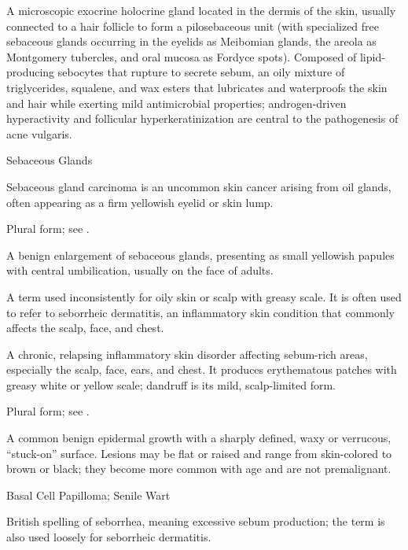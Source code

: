  A microscopic exocrine holocrine gland located in the dermis of the skin, usually connected to a hair follicle to form a pilosebaceous unit (with specialized free sebaceous glands occurring in the eyelids as Meibomian glands, the areola as Montgomery tubercles, and oral mucosa as Fordyce spots). Composed of lipid-producing sebocytes that rupture to secrete sebum, an oily mixture of triglycerides, squalene, and wax esters that lubricates and waterproofs the skin and hair while exerting mild antimicrobial properties; androgen-driven hyperactivity and follicular hyperkeratinization are central to the pathogenesis of acne vulgaris.

\synonyms
Sebaceous Glands

 Sebaceous gland carcinoma is an uncommon skin cancer arising from oil glands, often appearing as a firm yellowish eyelid or skin lump.

 Plural form; see .

 A benign enlargement of sebaceous glands, presenting as small yellowish papules with central umbilication, usually on the face of adults.

 A term used inconsistently for oily skin or scalp with greasy scale. It is often used to refer to seborrheic dermatitis, an inflammatory skin condition that commonly affects the scalp, face, and chest.

 A chronic, relapsing inflammatory skin disorder affecting sebum-rich areas, especially the scalp, face, ears, and chest. It produces erythematous patches with greasy white or yellow scale; dandruff is its mild, scalp-limited form.

 Plural form; see .

 A common benign epidermal growth with a sharply defined, waxy or verrucous, ``stuck-on'' surface. Lesions may be flat or raised and range from skin-colored to brown or black; they become more common with age and are not premalignant.

\synonyms
Basal Cell Papilloma; Senile Wart

 British spelling of seborrhea, meaning excessive sebum production; the term is also used loosely for seborrheic dermatitis.

